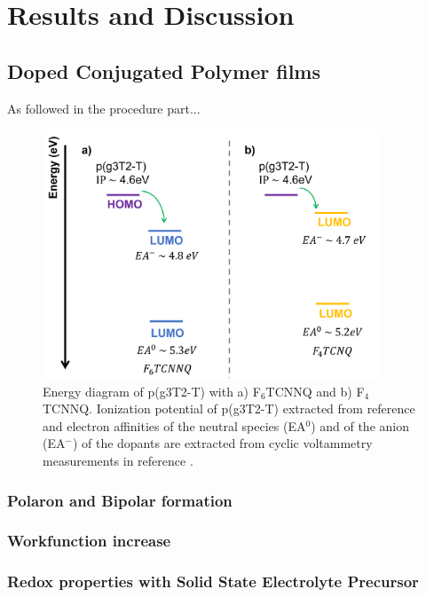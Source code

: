 \chapter{Results and Discussion}
\label{cha:3}

\section{Doped Conjugated Polymer films}

As followed in the procedure part...


\begin{figure}
  \centering
  \includegraphics[width=10cm]{Images/dopingprocess.png}
  \caption[Energy diagram of p(g3T2-T) and dopants F$_{6}$TCNNQ and F$_{4}$TCNNQ]{Energy diagram of p(g3T2-T) with a) F$_{6}$TCNNQ and b) F$_{4}$TCNNQ. Ionization potential of p(g3T2-T) extracted from reference \cite{tanTuningOrganicElectrochemical2022} and electron affinities of the neutral species (EA$^{0}$) and of the anion (EA$^{-}$) of the dopants are extracted from cyclic voltammetry measurements in reference \cite{kieferDoubleDopingConjugated2019}.}
  \label{fig:doping}
\end{figure}


\subsection{Polaron and Bipolar formation}

\subsection{Workfunction increase}

\subsection{Redox properties with Solid State Electrolyte Precursor}


